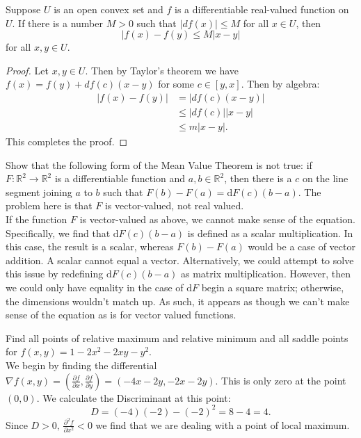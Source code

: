 \documentclass[12pt]{book}
\newcommand{\R}{\mathbb{R}}
\newenvironment{exercise}[2][Exercise]{\begin{trivlist}
\item[\hskip \labelsep {\bfseries #1}\hskip \labelsep {\bfseries #2.}]}{\end{trivlist}}
\begin{document}
\begin{exercise}{9.5.4}
    Suppose $U$ is an open convex set and $f$ is a differentiable real-valued function on $U$. If there is a number $M > 0$ such that $|df(x)| \leq M$ for all $x\in U$, then 
        \[ |f(x) - f(y) \leq M |x-y| \]
    for all $x,y \in U$.

    \begin{proof}
        Let $x,y \in U$. Then by Taylor's theorem we have $f(x) = f(y) + df(c) (x-y)$ for some $c \in [y,x]$. Then by algebra:
        \begin{align*}
            |f(x) - f(y) | &= |df(c)(x-y)| \\
                           &\leq |df(c)| |x-y| \\
                           &\leq m | x-y|.
        \end{align*}
        This completes the proof.
    \end{proof}
\end{exercise}


\begin{exercise}{9.5.6}
    Show that the following form of the Mean Value Theorem is not true: if $F:\R^2 \to \R^2$ is a differentiable function and $a,b \in \R^2$, then there is a $c$ on the line segment joining $a$ to $b$ such that $F(b) - F(a) = \text{d} F(c) (b-a)$. The problem here is that $F$ is vector-valued, not real valued.  \\
    
    If the function $F$ is vector-valued as above, we cannot make sense of the equation. Specifically, we find that $\text{d} F(c) (b-a)$ is defined as a scalar multiplication. In this case, the result is a scalar, whereas $F(b)-F(a)$ would be a case of vector addition. A scalar cannot equal a vector. Alternatively, we could attempt to solve this issue by redefining $\text{d} F(c) (b-a)$ as matrix multiplication. However, then we could only have equality in the case of $\text{d} F$ begin a square matrix; otherwise, the dimensions wouldn't match up. As such, it appears as though we can't make sense of the equation as is for vector valued functions.
\end{exercise}



\begin{exercise}{9.5.8}
    Find all points of relative maximum and relative minimum and all saddle points for $f(x,y) = 1 - 2 x^2 - 2 x y- y^2$.  \\
    
    We begin by finding the differential $\nabla f(x,y) = \left( \frac{\partial f}{\partial x}, \frac{\partial f}{\partial y} \right) = \left( -4x-2y, -2x-2y \right)$. This is only zero at the point $(0,0)$. We calculate the Discriminant at this point:
        \[ D = (-4)(-2)- (-2)^2 = 8 -4 = 4. \]
    Since $D>0, \, \frac{\partial^2 f}{\partial x^2} < 0$ we find that we are dealing with a point of local maximum.
\end{exercise}
\end{document}
